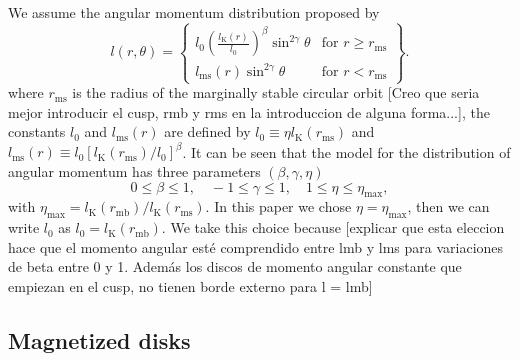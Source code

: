 \documentclass{aa}
\begin{document}
We assume the angular momentum distribution proposed by \citet{Qian:2009} 
\begin{equation}
l (r,\theta) = \left\{ \label{eq:ansatz} 
  \begin{array}{lr}
    l_0 \left(\frac{l_{\mathrm{K}}(r)}{l_0}\right)^{\beta}\sin^{2\gamma}{\theta} &  \text{for } r \geq r_{\mathrm{ms}}\\
    l_{\mathrm{ms}}(r)\sin^{2\gamma}{\theta} & \text{for } r < r_{\mathrm{ms}}
  \end{array}
\right\}.
\end{equation}
where $r_{\mathrm{ms}}$ is the radius of the marginally stable circular orbit [Creo que seria mejor introducir el cusp, rmb y rms en la introduccion de alguna forma...], the constants $l_0$ and $l_{\mathrm{ms}}(r)$ are defined by $l_0 \equiv \eta l_{\mathrm{K}}(r_{\mathrm{ms}})$ and $l_{\mathrm{ms}}(r) \equiv l_0 [l_{\mathrm{K}}(r_{\mathrm{ms}})/l_0]^{\beta}$. It can be seen that the model for the distribution of angular momentum has three parameters $(\beta, \gamma, \eta)$
\begin{equation}
0 \leq \beta \leq 1, \quad -1 \leq \gamma \leq 1, \quad 1 \leq \eta \leq \eta_{\mathrm{max}},
\end{equation}
with $\eta_{\mathrm{max}} = l_{\mathrm{K}}(r_{\mathrm{mb}})/l_{\mathrm{K}}(r_{\mathrm{ms}})$. In this paper we chose $\eta = \eta_{\mathrm{max}}$, then we can write $l_0$ as $l_0 = l_{\mathrm{K}}(r_{\mathrm{mb}})$. We take this choice because [explicar que esta eleccion hace que el momento angular esté comprendido entre lmb y lms para variaciones de beta entre 0 y 1. Además los discos de momento angular constante que empiezan en el cusp, no tienen borde externo para l = lmb]

\subsection{Magnetized disks}
\end{document}
